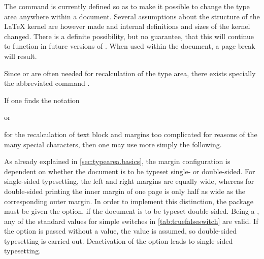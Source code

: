 \begin{Explain}
  The command  is currently defined so as to make it
  possible to change the type area anywhere within a
  document. Several assumptions about the structure of the {\LaTeX}
  kernel are however made and internal definitions and sizes of the
  kernel changed. There is a definite possibility, but no guarantee,
  that this will continue to function in future versions of
  \LaTeXe{}. When used within the document, a page break will result.
\end{Explain}

Since  or
%
 are often needed for
recalculation of the type area, there exists specially the abbreviated command
.

\begin{Example}
  If one finds the notation
\begin{lstcode}
\end{lstcode}
  or
\begin{lstcode}
\end{lstcode}
  for the recalculation of text block and margins too complicated for
  reasons of the many special characters, then one may use more simply
  the following.
\begin{lstcode}
  \recalctypearea
\end{lstcode}
\end{Example}%
\EndIndexGroup


\begin{Declaration}
\end{Declaration}%
As already explained in \autoref{sec:typearea.basics}, the margin
configuration is dependent on whether the document is to be typeset
single- or double-sided. For single-sided typesetting, the left and
right margins are equally wide, whereas for double-sided printing the
inner margin of one page is only half as wide as the corresponding
outer margin. In order to implement this distinction, the
 package must be given the  option,
if the document is to be typeset double-sided. Being a ,
any of the standard values for simple switches in
\autoref{tab:truefalseswitch} are valid. If the option is passed
without a value, the value  is assumed, so double-sided
typesetting is carried out. Deactivation of the option leads to
single-sided typesetting.

